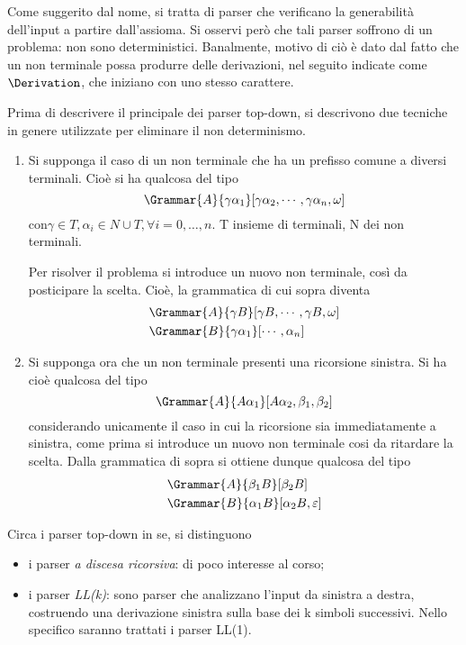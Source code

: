 \documentclass{subfiles}
\begin{document}
Come suggerito dal nome, si tratta di parser che verificano la generabilità dell'input a partire dall'assioma.
Si osservi però che tali parser soffrono di un problema: non sono deterministici.
Banalmente, motivo di ciò è dato dal fatto che un non terminale possa produrre delle derivazioni, nel seguito indicate come \(\Derivation\),
che iniziano con uno stesso carattere.

Prima di descrivere il principale dei parser top-down, si descrivono due tecniche in genere utilizzate per eliminare il non determinismo.
\begin{enumerate}
    \item Si supponga il caso di un non terminale che ha un prefisso comune a diversi terminali.
          Cioè si ha qualcosa del tipo
          \[
              \Grammar{A}{\gamma \alpha_{1}}[\gamma \alpha_{2}, \cdots, \gamma \alpha_{n}, \omega]
          \]
          con\(\gamma \in T, \alpha_{i} \in N \cup T, \forall i = 0, \ldots, n\). T insieme di terminali, N dei non terminali.

          Per risolver il problema si introduce un nuovo non terminale, così da posticipare la scelta.
          Cioè, la grammatica di cui sopra diventa
          \[\begin{aligned}
                   & \Grammar{A}{\gamma B}[\gamma B, \cdots, \gamma B, \omega] \\
                   & \Grammar{B}{\gamma \alpha_{1}}[\cdots, \alpha_{n}]        \\
              \end{aligned}\]
    \item Si supponga ora che un non terminale presenti una ricorsione sinistra.
          Si ha cioè qualcosa del tipo
          \[
              \Grammar{A}{A \alpha_{1}}[A \alpha_{2}, \beta_{1}, \beta_{2}]
          \]
          considerando unicamente il caso in cui la ricorsione sia immediatamente a sinistra,
          come prima si introduce un nuovo non terminale cosi da ritardare la scelta.
          Dalla grammatica di sopra si ottiene dunque qualcosa del tipo
          \[\begin{aligned}
                   & \Grammar{A}{\beta_{1} B}[\beta_{2} B]                \\
                   & \Grammar{B}{\alpha_{1} B}[\alpha_{2} B, \varepsilon] \\
              \end{aligned}\]
\end{enumerate}
Circa i parser top-down in se, si distinguono
\begin{itemize}
    \item i parser \emph{a discesa ricorsiva}: di poco interesse al corso;
    \item i parser \emph{LL(k)}: sono parser che analizzano l'input da sinistra a destra,
          costruendo una derivazione sinistra sulla base dei k simboli successivi.
          Nello specifico saranno trattati i parser LL(1).
\end{itemize}
\end{document}
